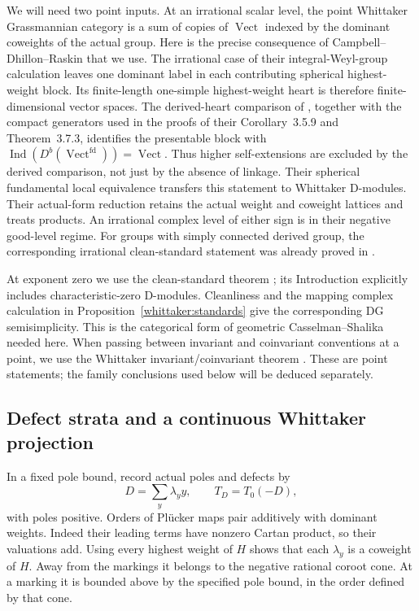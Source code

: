 We will need two point inputs. At an irrational scalar level, the point
Whittaker Grassmannian category is a sum of copies of
$\operatorname{Vect}$ indexed by the dominant coweights of the actual
group. Here is the precise consequence of Campbell--Dhillon--Raskin that
we use. The irrational case of their integral-Weyl-group calculation
\cite[Theorem~3.5.6, Equation~(3.28)]{CDR} leaves one dominant label in
each contributing spherical highest-weight block. Its finite-length
one-simple highest-weight heart is therefore finite-dimensional vector spaces.
The derived-heart comparison of \cite[Section~2.9.4]{CDR}, together with
the compact generators used in the proofs of their Corollary~3.5.9 and
Theorem~3.7.3, identifies the presentable block with
$\operatorname{Ind}(D^b(\operatorname{Vect}^{\mathrm{fd}}))=
\operatorname{Vect}$. Thus higher self-extensions are excluded by the
derived comparison, not just by the absence of linkage. Their spherical
fundamental local equivalence \cite[Remark~3.7.5]{CDR} transfers this
statement to Whittaker D-modules. Their actual-form reduction
\cite[Section~4.2, Proposition~4.2.2, and Section~4.3]{CDR} retains the
actual weight and coweight lattices and treats products. An irrational
complex level of either sign is in their negative good-level regime.
For groups with simply connected derived group, the corresponding
irrational clean-standard statement was already proved in
\cite[Proposition~8.4]{GaitsgoryTwisted}.

At exponent zero we use the clean-standard theorem
\cite[Theorem~3]{FrenkelGaitsgoryVilonen}; its Introduction explicitly
includes characteristic-zero D-modules. Cleanliness and the mapping
complex calculation in Proposition~\ref{whittaker:standards} give the
corresponding DG semisimplicity. This is the categorical form of geometric
Casselman--Shalika needed here. When passing between invariant and
coinvariant conventions at a point, we use the Whittaker
invariant/coinvariant theorem \cite[Theorem~2.1.1]{RaskinW}. These are point
statements; the family conclusions used below will be deduced separately.

\subsection{Defect strata and a continuous Whittaker projection}

In a fixed pole bound, record actual poles and defects by
\[
 D=\sum_y\lambda_y y,\qquad T_D=T_0(-D),
\]
with poles positive. Orders of Pl\"ucker maps pair additively with dominant
weights. Indeed their leading terms have nonzero Cartan product, so their
valuations add. Using every highest weight of $H$ shows that each
$\lambda_y$ is a coweight of $H$. Away from the markings it belongs to the
negative rational coroot cone. At a marking it is bounded above by the
specified pole bound, in the order defined by that cone.

